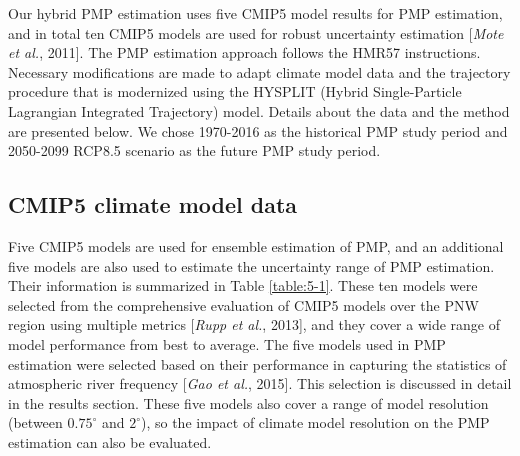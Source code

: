 Our hybrid PMP estimation uses five CMIP5 model results for PMP estimation, and in total ten CMIP5 models are used for robust uncertainty estimation [\textit{Mote et al.}, 2011]. The PMP estimation approach follows the HMR57 instructions. Necessary modifications are made to adapt climate model data and the trajectory procedure that is modernized using the HYSPLIT (Hybrid Single-Particle Lagrangian Integrated Trajectory) model. Details about the data and the method are presented below. We chose 1970-2016 as the historical PMP study period and 2050-2099 RCP8.5 scenario as the future PMP study period.

\subsection{CMIP5 climate model data}

Five CMIP5 models are used for ensemble estimation of PMP, and an additional  five models are also used to estimate the uncertainty range of PMP estimation. Their information is summarized in Table \ref{table:5-1}. These ten models were selected from the comprehensive evaluation of CMIP5 models over the PNW region using multiple metrics [\textit{Rupp et al.}, 2013], and they cover a wide range of model performance from best to average. The five models used in PMP estimation were selected based on their performance in capturing the statistics of atmospheric river frequency [\textit{Gao et al.}, 2015]. This selection is discussed in detail in the results section. These five models also cover a range of model resolution (between $0.75^{\circ}$ and $2^{\circ}$), so the impact of climate model resolution on the PMP estimation can also be evaluated.

